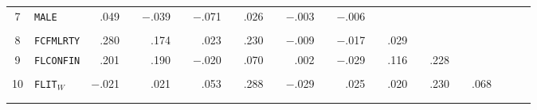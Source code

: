 {\begin{tabular}{cl rc rc rc rc rc rc rc rc rc rc}
            7     & \texttt{MALE}  & \cellcolor[rgb]{ .953,  .953,  1}.049 &       & \cellcolor[rgb]{ 1,  .961,  .961}$-.$039 &       & \cellcolor[rgb]{ 1,  .925,  .925}$-.$071 &       & \cellcolor[rgb]{ .976,  .976,  1}.026 &       & \cellcolor[rgb]{ 1,  .996,  .996}$-.$003 &       & \cellcolor[rgb]{ 1,  .992,  .992}$-.$006 &       &       &       &       &       &       &       &       &  \\
                  &       &       &       &       &       &       &       &       &       &       &       &       &       &       &       &       &       &       &       &       &  \\
            8     & \texttt{FCFMLRTY} & \cellcolor[rgb]{ .722,  .722,  1}.280 &       & \cellcolor[rgb]{ .827,  .827,  1}.174 &       & \cellcolor[rgb]{ .98,  .98,  1}.023 &       & \cellcolor[rgb]{ .773,  .773,  1}.230 &       & \cellcolor[rgb]{ 1,  .988,  .988}$-.$009 &       & \cellcolor[rgb]{ 1,  .98,  .98}$-.$017 &       & \cellcolor[rgb]{ .973,  .973,  1}.029 &       &       &       &       &       &       &  \\
            9     & \texttt{FLCONFIN} & \cellcolor[rgb]{ .8,  .8,  1}.201 &       & \cellcolor[rgb]{ .812,  .812,  1}.190 &       & \cellcolor[rgb]{ 1,  .976,  .976}$-.$020 &       & \cellcolor[rgb]{ .933,  .933,  1}.070 &       & .002 &       & \cellcolor[rgb]{ 1,  .969,  .969}$-.$029 &       & \cellcolor[rgb]{ .886,  .886,  1}.116 &       & \cellcolor[rgb]{ .773,  .773,  1}.228 &       &       &       &       &  \\
                  &       &       &       &       &       &       &       &       &       &       &       &       &       &       &       &       &       &       &       &       &  \\
            10    & \texttt{FLIT}$_W$  & \cellcolor[rgb]{ 1,  .976,  .976}$-.$021 &       & \cellcolor[rgb]{ .98,  .98,  1}.021 &       & \cellcolor[rgb]{ .949,  .949,  1}.053 &       & \cellcolor[rgb]{ .714,  .714,  1}.288 &       & \cellcolor[rgb]{ 1,  .969,  .969}$-.$029 &       & \cellcolor[rgb]{ .976,  .976,  1}.025 &       & \cellcolor[rgb]{ .98,  .98,  1}.020 &       & \cellcolor[rgb]{ .773,  .773,  1}.230 &       & \cellcolor[rgb]{ .933,  .933,  1}.068 &       &       &  \\
            \bottomrule
                  &       &       &       &       &       &       &       &       &       &       &       &       &       &       &       &       &       &       &       &       &  \\
                  &       &       &       &       &       &       &       &       &       &       &       &       &       &       &       &       &       &       &       &       &  \\

\end{tabular}}
